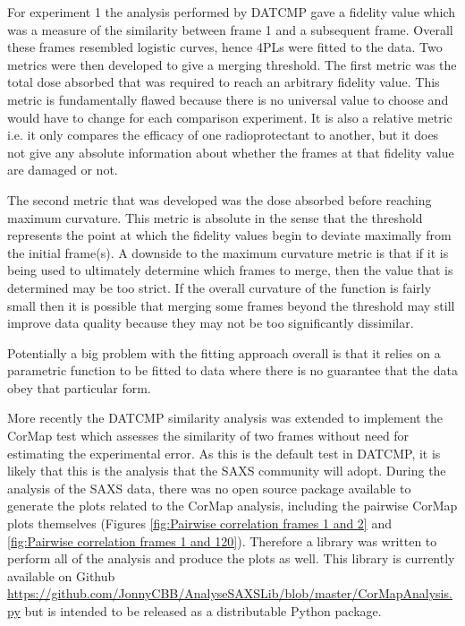 For experiment 1 the analysis performed by DATCMP gave a fidelity value which was a measure of the similarity between frame 1 and a subsequent frame.
Overall these frames resembled logistic curves, hence 4PLs were fitted to the data.
Two metrics were then developed to give a merging threshold. The first metric was the total dose absorbed that was required to reach an arbitrary fidelity value.
This metric is fundamentally flawed because there is no universal value to choose and would have to change for each comparison experiment.
It is also a relative metric i.e. it only compares the efficacy of one radioprotectant to another, but it does not give any absolute information about whether the frames at that fidelity value are damaged or not.

The second metric that was developed was the dose absorbed before reaching maximum curvature.
This metric is absolute in the sense that the threshold represents the point at which the fidelity values begin to deviate maximally from the initial frame(s).
A downside to the maximum curvature metric is that if it is being used to ultimately determine which frames to merge, then the value that is determined may be too strict.
If the overall curvature of the function is fairly small then it is possible that merging some frames beyond the threshold may still improve data quality because they may not be too significantly dissimilar.

Potentially a big problem with the fitting approach overall is that it relies on a parametric function to be fitted to data where there is no guarantee that the data obey that particular form.

More recently the DATCMP similarity analysis was extended to implement the CorMap test which assesses the similarity of two frames without need for estimating the experimental error.
As this is the default test in DATCMP, it is likely that this is the analysis that the SAXS community will adopt.
During the analysis of the SAXS data, there was no open source package available to generate the plots related to the CorMap analysis, including the pairwise CorMap plots themselves (Figures \ref{fig:Pairwise correlation frames 1 and 2} and \ref{fig:Pairwise correlation frames 1 and 120}).
Therefore a library was written to perform all of the analysis and produce the plots as well.
This library is currently available on Github \url{https://github.com/JonnyCBB/AnalyseSAXSLib/blob/master/CorMapAnalysis.py} but is intended to be released as a distributable Python package.

